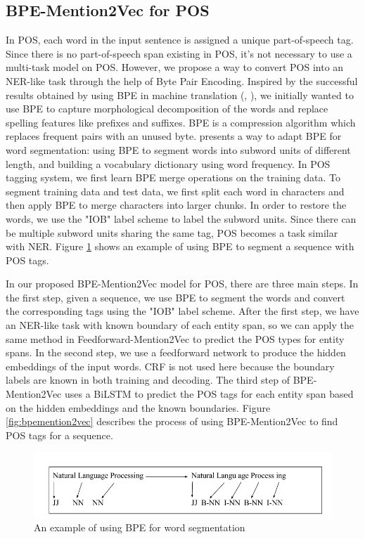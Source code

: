 \subsection{BPE-Mention2Vec for POS}
In POS, each word in the input sentence is assigned a unique part-of-speech tag. Since there is no part-of-speech span existing in POS, it's not necessary to use a multi-task model on POS. However, we propose a way to convert POS into an NER-like task through the help of Byte Pair Encoding. Inspired by the successful results obtained by using BPE in machine translation (\citeauthor{sennrich2015neural}, \citeyear{sennrich2015neural}), we initially wanted to use BPE to capture morphological decomposition of the words and replace spelling features like prefixes and suffixes. BPE is a compression algorithm which replaces frequent pairs with an unused byte. \cite{sennrich2015neural} presents a way to adapt BPE for word segmentation: using BPE to segment words into subword units of different length, and building a vocabulary dictionary using word frequency. In POS tagging system, we first learn BPE merge operations on the training data. To segment training data and test data, we first split each word in characters and then apply BPE to merge characters into larger chunks. In order to restore the words, we use the "IOB" label scheme to label the subword units. Since there can be multiple subword units sharing the same tag, POS becomes a task similar with NER. Figure \ref{fig:bpe} shows an example of using BPE to segment a sequence with POS tags. 

In our proposed BPE-Mention2Vec model for POS, there are three main steps. In the first step, given a sequence, we use BPE to segment the words and convert the corresponding tags using the "IOB" label scheme. After the first step, we have an NER-like task with known boundary of each entity span, so we can apply the same method in Feedforward-Mention2Vec to predict the POS types for entity spans. In the second step, we use a feedforward network to produce the hidden embeddings of the input words. CRF is not used here because the boundary labels are known in both training and decoding. The third step of BPE-Mention2Vec uses a BiLSTM to predict the POS tags for each entity span based on the hidden embeddings and the known boundaries. Figure \ref{fig:bpemention2vec} describes the process of using BPE-Mention2Vec to find POS tags for a sequence. 


\begin{figure}
  \centering
  \includegraphics[scale=0.5]{bpe.png}
 \caption{An example of using BPE for word segmentation}
  \label{fig:bpe}
\end{figure}


